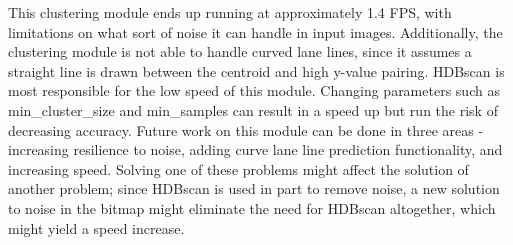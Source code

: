 \documentclass[twoside,twocolumn]{article}
\begin{document}
\par This clustering module ends up running at approximately 1.4 FPS, with limitations on what sort of noise it can handle in input images. Additionally, the clustering module is not able to handle curved lane lines, since it assumes a straight line is drawn between the centroid and high y-value pairing. HDBscan is most responsible for the low speed of this module. Changing parameters such as min\_cluster\_size and min\_samples can result in a speed up but run the risk of decreasing accuracy. Future work on this module can be done in three areas - increasing resilience to noise, adding curve lane line prediction functionality, and increasing speed. Solving one of these problems might affect the solution of another problem; since HDBscan is used in part to remove noise, a new solution to noise in the bitmap might eliminate the need for HDBscan altogether, which might yield a speed increase.
\end{document}
